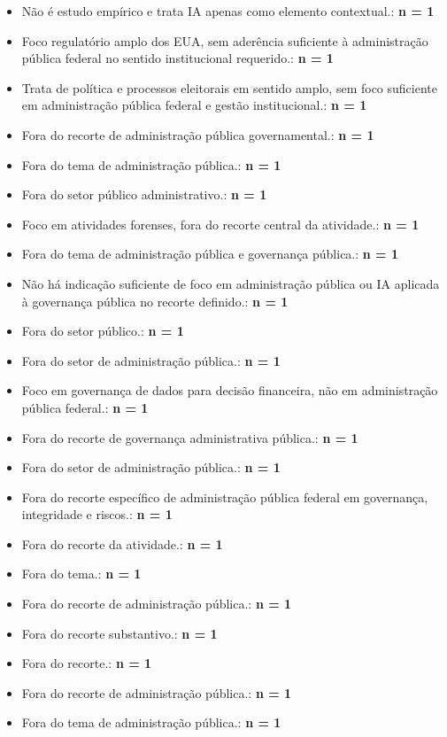 \documentclass[12pt,a4paper]{article}
\begin{document}
\begin{itemize}
\begin{itemize}
\item Não é estudo empírico e trata IA apenas como elemento contextual.: \textbf{n = 1}
\item Foco regulatório amplo dos EUA, sem aderência suficiente à administração pública federal no sentido institucional requerido.: \textbf{n = 1}
\item Trata de política e processos eleitorais em sentido amplo, sem foco suficiente em administração pública federal e gestão institucional.: \textbf{n = 1}
\item Fora do recorte de administração pública governamental.: \textbf{n = 1}
\item Fora do tema de administração pública.: \textbf{n = 1}
\item Fora do setor público administrativo.: \textbf{n = 1}
\item Foco em atividades forenses, fora do recorte central da atividade.: \textbf{n = 1}
\item Fora do tema de administração pública e governança pública.: \textbf{n = 1}
\item Não há indicação suficiente de foco em administração pública ou IA aplicada à governança pública no recorte definido.: \textbf{n = 1}
\item Fora do setor público.: \textbf{n = 1}
\item Fora do setor de administração pública.: \textbf{n = 1}
\item Foco em governança de dados para decisão financeira, não em administração pública federal.: \textbf{n = 1}
\item Fora do recorte de governança administrativa pública.: \textbf{n = 1}
\item Fora do setor de administração pública.: \textbf{n = 1}
\item Fora do recorte específico de administração pública federal em governança, integridade e riscos.: \textbf{n = 1}
\item Fora do recorte da atividade.: \textbf{n = 1}
\item Fora do tema.: \textbf{n = 1}
\item Fora do recorte de administração pública.: \textbf{n = 1}
\item Fora do recorte substantivo.: \textbf{n = 1}
\item Fora do recorte.: \textbf{n = 1}
\item Fora do recorte de administração pública.: \textbf{n = 1}
\item Fora do tema de administração pública.: \textbf{n = 1}

\end{itemize}
\end{itemize}
\end{document}

